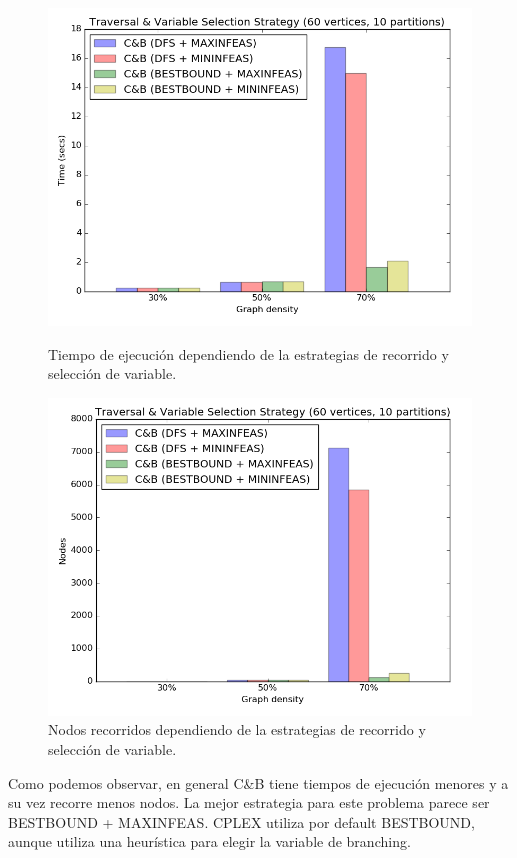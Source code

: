 \begin{figure}[h]
\begin{minipage}[b]{0.49\textwidth}
    \includegraphics[width=\textwidth]{img/9-tree_v60_p10_i1_l30_s2.png}
  \caption{Tiempo de ejecución dependiendo de la estrategias de recorrido y selección de variable.}
  \end{minipage}
  \hfill
  \begin{minipage}[b]{0.49\textwidth}
    \includegraphics[width=\textwidth]{img/9-tree_v60_p10_i1_l30_s2_nodes.png}
  \caption{Nodos recorridos dependiendo de la estrategias de recorrido y selección de variable.}
  \end{minipage}
\end{figure}

Como podemos observar, en general C\&B tiene tiempos de ejecución menores y a su vez recorre menos nodos. La mejor estrategia para este problema parece ser BESTBOUND + MAXINFEAS. CPLEX utiliza por default BESTBOUND, aunque utiliza una heurística para elegir la variable de branching. 

